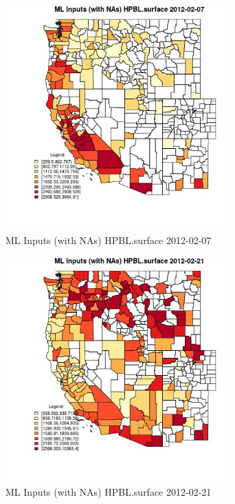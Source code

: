 \begin{figure} 
\centering  
\includegraphics[width=0.77\textwidth]{Code_Outputs/Report_ML_input_PM25_Step4_part_f_de_duplicated_aveswNAs_CountyHPBLsurfaceMean2012-02-07.jpg} 
\caption{\label{fig:Report_ML_input_PM25_Step4_part_f_de_duplicated_aveswNAsCountyHPBLsurfaceMean2012-02-07}ML Inputs (with NAs) HPBL.surface 2012-02-07} 
\end{figure} 
 

\begin{figure} 
\centering  
\includegraphics[width=0.77\textwidth]{Code_Outputs/Report_ML_input_PM25_Step4_part_f_de_duplicated_aveswNAs_CountyHPBLsurfaceMean2012-02-21.jpg} 
\caption{\label{fig:Report_ML_input_PM25_Step4_part_f_de_duplicated_aveswNAsCountyHPBLsurfaceMean2012-02-21}ML Inputs (with NAs) HPBL.surface 2012-02-21} 
\end{figure} 
 

